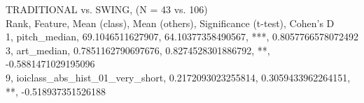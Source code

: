 TRADITIONAL vs. SWING, (N = 43 vs. 106)\\
Rank, Feature, Mean (class), Mean (others), Significance (t-test), Cohen's D\\
1, pitch_median, 69.1046511627907, 64.10377358490567, ***, 0.8057766578072492\\
3, art_median, 0.7851162790697676, 0.8274528301886792, **, -0.5881471029195096\\
9, ioiclass_abs_hist_01_very_short, 0.2172093023255814, 0.3059433962264151, **, -0.518937351526188\\
